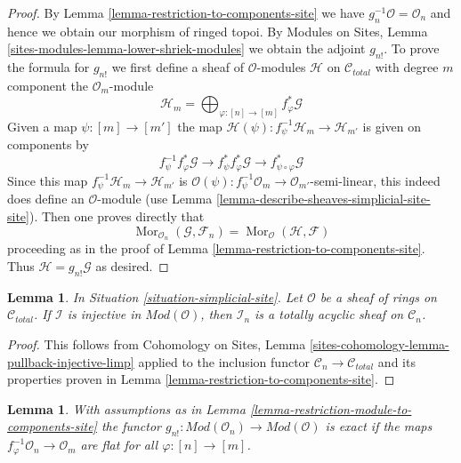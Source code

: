 \documentclass{stacks-project}
\theoremstyle{plain}
\newtheorem{lemma}[subsection]{Lemma}
\theoremstyle{definition}
\theoremstyle{remark}
\numberwithin{equation}{subsection}
\def\Mor{\mathop{\mathrm{Mor}}\nolimits}
\begin{document}
\begin{proof}
By Lemma \ref{lemma-restriction-to-components-site} we have
$g_n^{-1}\mathcal{O} = \mathcal{O}_n$ and hence we obtain our
morphism of ringed topoi. By Modules on Sites, Lemma
\ref{sites-modules-lemma-lower-shriek-modules}
we obtain the adjoint $g_{n!}$. To prove the formula for $g_{n!}$
we first define a sheaf of $\mathcal{O}$-modules $\mathcal{H}$
on $\mathcal{C}_{total}$ with degree $m$ component
the $\mathcal{O}_m$-module
$$
\mathcal{H}_m =
\bigoplus\nolimits_{\varphi : [n] \to [m]} f_\varphi^*\mathcal{G}
$$
Given a map $\psi : [m] \to [m']$ the map
$\mathcal{H}(\psi) : f_\psi^{-1}\mathcal{H}_m \to \mathcal{H}_{m'}$
is given on components by
$$
f_\psi^{-1} f_\varphi^*\mathcal{G} \to
f_\psi^* f_\varphi^*\mathcal{G} \to
f_{\psi \circ \varphi}^*\mathcal{G}
$$
Since this map $f_\psi^{-1}\mathcal{H}_m \to \mathcal{H}_{m'}$ is
$\mathcal{O}(\psi) : f_\psi^{-1}\mathcal{O}_m \to \mathcal{O}_{m'}$-semi-linear,
this indeed does define an $\mathcal{O}$-module
(use Lemma \ref{lemma-describe-sheaves-simplicial-site-site}).
Then one proves directly that
$$
\Mor_{\mathcal{O}_n}(\mathcal{G}, \mathcal{F}_n) =
\Mor_{\mathcal{O}}(\mathcal{H}, \mathcal{F})
$$
proceeding as in the proof of Lemma \ref{lemma-restriction-to-components-site}.
Thus $\mathcal{H} = g_{n!}\mathcal{G}$ as desired.
\end{proof}

\begin{lemma}
\label{lemma-restriction-injective-to-component-limp}
In Situation \ref{situation-simplicial-site}.
Let $\mathcal{O}$ be a sheaf of rings on $\mathcal{C}_{total}$.
If $\mathcal{I}$ is injective in $\textit{Mod}(\mathcal{O})$, then
$\mathcal{I}_n$ is a totally acyclic sheaf on $\mathcal{C}_n$.
\end{lemma}

\begin{proof}
This follows from
Cohomology on Sites, Lemma \ref{sites-cohomology-lemma-pullback-injective-limp}
applied to the inclusion functor $\mathcal{C}_n \to \mathcal{C}_{total}$
and its properties proven in Lemma \ref{lemma-restriction-to-components-site}.
\end{proof}

\begin{lemma}
\label{lemma-exactness-g-shriek-modules}
With assumptions as in
Lemma \ref{lemma-restriction-module-to-components-site} the functor
$g_{n!} : \textit{Mod}(\mathcal{O}_n) \to \textit{Mod}(\mathcal{O})$
is exact if the maps $f_\varphi^{-1}\mathcal{O}_n \to \mathcal{O}_m$
are flat for all $\varphi : [n] \to [m]$.
\end{lemma}
\end{document}
